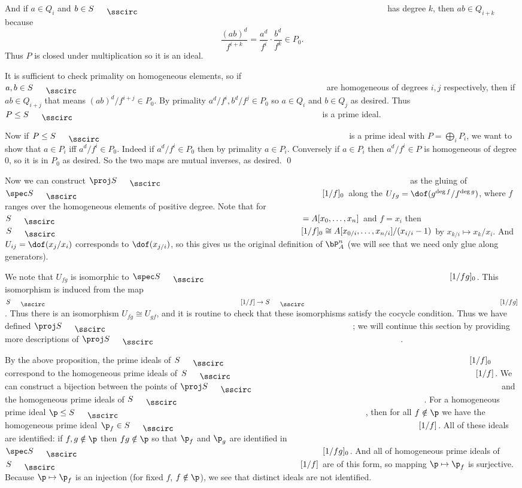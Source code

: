     And if $a\in Q_i$ and $b\in S_\bul$ has degree $k$, then $ab\in Q_{i+k}$ because
    $$ \frac{(ab)^d}{f^{i+k}} = \frac{a^d}{f^i}\cdot\frac{b^d}{f^k} \in P_0 . $$
    Thus $P$ is closed under multiplication so it is an ideal.

    It is sufficient to check primality on homogeneous elements, so if $a,b\in S_\bul$ are homogeneous of degrees $i,j$ respectively,
    then if $ab\in Q_{i+j}$ that means $(ab)^d/f^{i+j}\in P_0$.
    By primality $a^d/f^i,b^d/f^j\in P_0$ so $a\in Q_i$ and $b\in Q_j$ as desired.
    Thus $P\leq S_\bul$ is a prime ideal.

    Now if $P\leq S_\bul$ is a prime ideal with $P=\bigoplus_iP_i$, we want to show that $a\in P_i$ iff $a^d/f^i\in P_0$.
    Indeed if $a^d/f^i\in P_0$ then by primality $a\in P_i$.
    Conversely if $a\in P_i$ then $a^d/f^i\in P$ is homogeneous of degree $0$, so it is in $P_0$ as desired.
    So the two maps are mutual inverses, as desired.
    \qed

\eproof

Now we can construct $\proj S_\bul$ as the gluing of $\spec S_\bul[1/f]_0$ along the $U_{fg}=\dof(g^{\deg f}/f^{\deg g})$, where $f$ ranges over the homogeneous elements
of positive degree.
Note that for $S_\bul=A[x_0,\dots,x_n]$ and $f=x_i$ then $S_\bul[1/f]_0\cong A[x_{0/i},\dots,x_{n/i}]/(x_{i/i}-1)$ by $x_{k/i}\mapsto x_k/x_i$.
And $U_{ij}=\dof(x_j/x_i)$ corresponds to $\dof(x_{j/i})$, so this gives us the original definition of $\bP^n_A$ (we will see that we need only glue along generators).

We note that $U_{fg}$ is isomorphic to $\spec S_\bul[1/fg]_0$.
This isomorphism is induced from the map $S_\bul[1/f]\to S_\bul[1/fg]$.
Thus there is an isomorphism $U_{fg}\cong U_{gf}$, and it is routine to check that these isomorphisms satisfy the cocycle condition.
Thus we have defined $\proj S_\bul$; we will continue this section by providing more descriptions of $\proj S_\bul$.

By the above proposition, the prime ideals of $S_\bul[1/f]_0$ correspond to the homogeneous prime ideals of $S_\bul[1/f]$.
We can construct a bijection between the points of $\proj S_\bul$ and the homogeneous prime ideals of $S_\bul$.
For a homogeneous prime ideal $\p\leq S_\bul$, then for all $f\notin\p$ we have the homogeneous prime ideal $\p_f\in S_\bul[1/f]$.
All of these ideals are identified: if $f,g\notin\p$ then $fg\notin\p$ so that $\p_f$ and $\p_g$ are identified in $\spec S_\bul[1/fg]_0$.
And all of homogeneous prime ideals of $S_\bul[1/f]$ are of this form, so mapping $\p\mapsto\p_f$ is surjective.
Because $\p\mapsto\p_f$ is an injection (for fixed $f$, $f\notin\p$), we see that distinct ideals are not identified.

